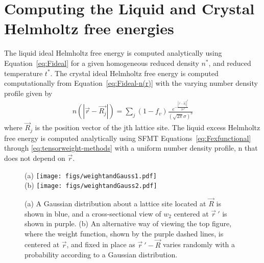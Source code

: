 \documentclass[double,12pt]{beavtex}
\begin{document}
\section{Computing the Liquid and Crystal Helmholtz free energies}

The liquid ideal Helmholtz free energy is computed analytically 
using Equation~\ref{eq:Fideal} 
for a given homogeneous reduced density $n^*$, and reduced temperature $t^*$. 
The crystal ideal Helmholtz free energy is computed computationally 
from Equation~\ref{eq:Fideal-n(r)} with the varying number density profile given by
\begin{align}
  n(|\vec{r}-\vec{R_j}|)=\sum_j{(1-f_v)\frac{e^{-\frac{{|\vec{r}-\vec{R_j}|}^2}{2{\sigma}^2}}}{\left(\sqrt{2\pi}\sigma\right)^3}}
\end{align}
where $\vec R_j$ is the position vector of the jth lattice site.
The liquid excess Helmholtz free energy is computed analytically  
using SFMT Equations~\ref{eq:Fexfunctional} through \ref{eq:tensorweight-methods} 
with a uniform number density profile, n that does not depend on $\vec r$. 

\begin{figure}
  \centering
  (a) \texttt{[image: figs/weightandGauss1.pdf]}\\
  (b) \texttt{[image: figs/weightandGauss2.pdf]}
  \caption{(a) A Gaussian distribution about a lattice site located at 
  $\vec R$ is shown in blue, and a cross-sectional 
  view of $w_2$ centered at $\vec r~'$ is shown in purple.
  (b) An alternative way of viewing the top figure, where 
  the weight function, shown by the purple dashed lines, is centered at $\vec{r}$,  
  and fixed in place as $\vec r~' - \vec R$
  varies randomly with a probability according to a Gaussian distribution.}
\label{fig:GaussandW2_actual}
\end{figure} 

\end{document}
